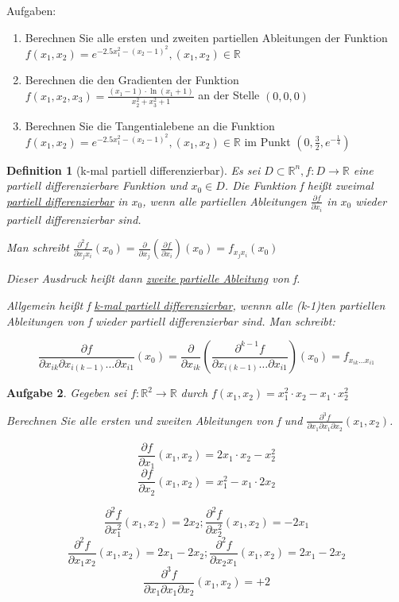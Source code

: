 \documentclass[12pt,a4paper]{scrreprt}
\newtheorem{defi}{Definition}[section]
\newtheorem{aufg}[defi]{Aufgabe}
\begin{document}
Aufgaben:

\begin{enumerate}
	\item Berechnen Sie alle ersten und zweiten partiellen Ableitungen der Funktion $f(x_1,x_2)=e^{-2.5x_1^2-(x_2-1)^2}, (x_1,x_2) \in \mathbb{R}$
	\item Berechnen die den Gradienten der Funktion $f(x_1,x_2,x_3)=\frac{(x_1-1)\cdot\ln(x_1+1)}{x_2^2+x_3^2+1}$ an der Stelle $(0,0,0)$
	\item Berechnen Sie die Tangentialebene an die Funktion  $f(x_1,x_2)=e^{-2.5x_1^2-(x_2-1)^2}, (x_1,x_2) \in \mathbb{R}$ im Punkt $(0,\frac{3}{2},e^{-\frac{1}{4}})$
\end{enumerate}

\begin{defi}[k-mal partiell differenzierbar]
	Es sei $D\subset\mathbb{R}^n,f:D\to\mathbb{R}$ eine partiell differenzierbare Funktion und $x_0 \in D$. Die Funktion f heißt zweimal \underline{partiell differenzierbar} in $x_0$, wenn alle partiellen Ableitungen $\frac{\partial f}{\partial x_i}$ in $x_0$ wieder partiell differenzierbar sind.

	Man schreibt $\frac{\partial^2 f}{\partial x_jx_i}(x_0)=\frac{\partial}{\partial x_j}\left(\frac{\partial f}{\partial x_i}\right)(x_0)=f_{x_jx_i}(x_0)$

	Dieser Ausdruck heißt dann \underline{zweite partielle Ableitung} von f.

	Allgemein heißt f \underline{k-mal partiell differenzierbar}, wennn alle (k-1)ten partiellen Ableitungen von f wieder partiell differenzierbar sind. Man schreibt:

	\[\frac{\partial f}{\partial x_{ik} \partial x_{i(k-1)} \dots \partial x_{i1}}(x_0) = \frac{\partial}{\partial x_{ik}}\left(\frac{\partial^{k-1} f}{\partial x_{i(k-1)} \dots \partial x_{i1}}\right)(x_0)=f_{x_{ik} \dots x_{i1}}\]
\end{defi}

\begin{aufg}
	Gegeben sei $f:\mathbb{R}^2\to\mathbb{R}$ durch $f(x_1,x_2)=x_1^2 \cdot x_2 - x_1 \cdot x_2^2$

	Berechnen Sie alle ersten und zweiten Ableitungen von f und $\frac{\partial^3 f}{\partial x_1 \partial x_1 \partial x_2}(x_1,x_2)$.

	\[\frac{\partial f}{\partial x_1}(x_1,x_2)=2x_1 \cdot x_2 - x_2^2 \]
	\[\frac{\partial f}{\partial x_2}(x_1,x_2)=x_1^2 - x_1 \cdot 2x_2 \]

	\[\frac{\partial^2 f}{\partial x_1^2}(x_1,x_2)=2x_2 ; \frac{\partial^2 f}{\partial x_2^2}(x_1,x_2)=-2x_1 \]
	\[\frac{\partial^2 f}{\partial x_1x_2}(x_1,x_2)=2x_1-2x_2 ; \frac{\partial^2 f}{\partial x_2x_1}(x_1,x_2)=2x_1-2x_2 \]
	\[\frac{\partial^3 f}{\partial x_1 \partial x_1 \partial x_2}(x_1,x_2)=+2\]
\end{aufg}
\end{document}
